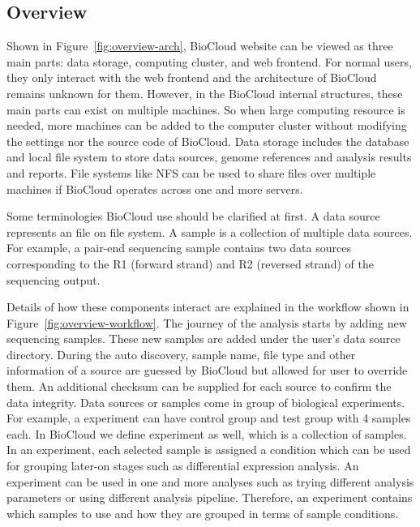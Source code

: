 


\subsection{Overview}

Shown in Figure~\ref{fig:overview-arch}, BioCloud website can be viewed as
three main parts: data storage, computing cluster, and web frontend. For normal
users, they only interact with the web frontend and the architecture of
BioCloud remains unknown for them. However, in the BioCloud internal
structures, these main parts can exist on multiple machines. So when large
computing resource is needed, more machines can be added to the computer
cluster without modifying the settings nor the source code of BioCloud. Data
storage includes the database and local file system to store data sources,
genome references and analysis results and reports. File systems like NFS can
be used to share files over multiple machines if BioCloud operates across one
and more servers.



Some terminologies BioCloud use should be clarified at first. A data source
represents an file on file system. A sample is a collection of multiple data
sources. For example, a pair-end sequencing sample contains two data sources
corresponding to the R1 (forward strand) and R2 (reversed strand) of
the sequencing output.



Details of how these components interact are explained in the workflow shown in
Figure~\ref{fig:overview-workflow}. The journey of the analysis starts by
adding new sequencing samples. These new samples are added under the user's
data source directory. During the auto discovery, sample name, file type and
other information of a source are guessed by BioCloud but allowed for user to
override them. An additional checksum can be supplied for each source to
confirm the data integrity. Data sources or samples come in group of biological
experiments. For example, a experiment can have control group and test group
with 4 samples each. In BioCloud we define experiment as well, which is a
collection of samples. In an experiment, each selected sample is assigned a
condition which can be used for grouping later-on stages such as differential
expression analysis. An experiment can be used in one and more analyses such as
trying different analysis parameters or using different analysis pipeline.
Therefore, an experiment contains which samples to use and how they are grouped
in terms of sample conditions.

